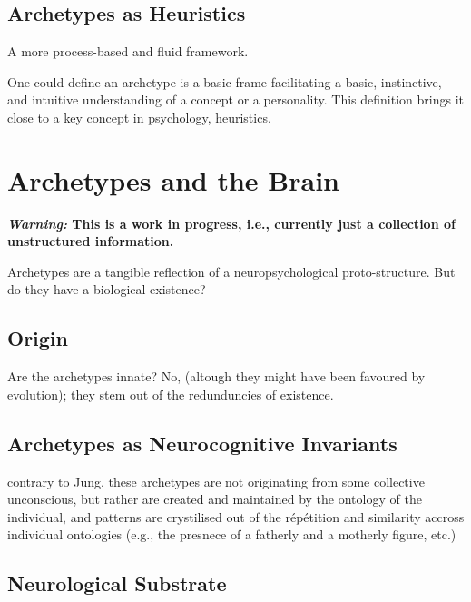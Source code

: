 \documentclass[
]{book}
\begin{document}
\hypertarget{archetypes-as-heuristics}{%
\section{Archetypes as Heuristics}\label{archetypes-as-heuristics}}

A more process-based and fluid framework.

One could define an archetype is a basic frame facilitating a basic, instinctive, and intuitive understanding of a concept or a personality. This definition brings it close to a key concept in psychology, heuristics.

\hypertarget{archetypes-and-the-brain}{%
\chapter{Archetypes and the Brain}\label{archetypes-and-the-brain}}

\textbf{\emph{Warning:} This is a work in progress, i.e., currently just a collection of unstructured information.}

Archetypes are a tangible reflection of a neuropsychological proto-structure. But do they have a biological existence?

\hypertarget{origin}{%
\section{Origin}\label{origin}}

Are the archetypes innate? No, (altough they might have been favoured by evolution); they stem out of the redunduncies of existence.

\hypertarget{archetypes-as-neurocognitive-invariants}{%
\section{Archetypes as Neurocognitive Invariants}\label{archetypes-as-neurocognitive-invariants}}

contrary to Jung, these archetypes are not originating from some collective unconscious, but rather are created and maintained by the ontology of the individual, and patterns are crystilised out of the répétition and similarity accross individual ontologies (e.g., the presnece of a fatherly and a motherly figure, etc.)

\hypertarget{neurological-substrate}{%
\section{Neurological Substrate}\label{neurological-substrate}}
\end{document}

